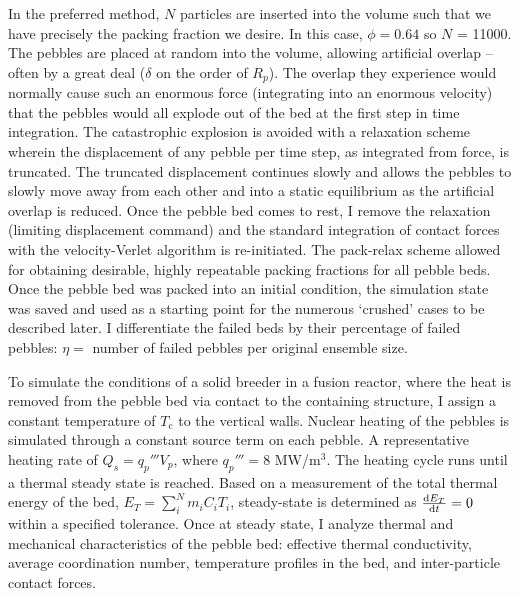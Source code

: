 In the preferred method, $N$ particles are inserted into the volume such that we have precisely the packing fraction we desire. In this case, $\phi = 0.64$ so $N$ = \num{11000}. The pebbles are placed at random into the volume, allowing artificial overlap -- often by a great deal ($\delta$ on the order of $R_p$). The overlap they experience would normally cause such an enormous force (integrating into an enormous velocity) that the pebbles would all explode out of the bed at the first step in time integration. The catastrophic explosion is avoided with a relaxation scheme wherein the displacement of any pebble per time step, as integrated from force, is truncated. The truncated displacement continues slowly and allows the pebbles to slowly move away from each other and into a static equilibrium as the artificial overlap is reduced. Once the pebble bed comes to rest, I remove the relaxation (limiting displacement command) and the standard integration of contact forces with the velocity-Verlet algorithm is re-initiated. The pack-relax scheme allowed for obtaining desirable, highly repeatable packing fractions for all pebble beds. Once the pebble bed was packed into an initial condition, the simulation state was saved and used as a starting point for the numerous `crushed' cases to be described later. I differentiate the failed beds by their percentage of failed pebbles: $\eta = $ number of failed pebbles per original ensemble size.


To simulate the conditions of a solid breeder in a fusion reactor, where the heat is removed from the pebble bed via contact to the containing structure, I assign a constant temperature of $T_\text{c}$ to the vertical walls. Nuclear heating of the pebbles is simulated through a constant source term on each pebble. A representative heating rate of $Q_s = q_p'''V_p$, where  $q_p'''= 8$ MW/m$^3$. The heating cycle runs until a thermal steady state is reached. Based on a measurement of the total thermal energy of the bed, $E_T =\sum_i^N m_iC_i T_i$, steady-state is determined as $\frac{\mathrm{d}{E_T}}{\mathrm{d}t} = 0$ within a specified tolerance. Once at steady state, I analyze thermal and mechanical characteristics of the pebble bed: effective thermal conductivity, average coordination number, temperature profiles in the bed, and inter-particle contact forces. 

